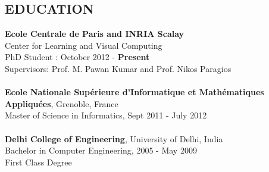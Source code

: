 \documentclass{res}
\begin{document}
        \begin{resume}


        \section{EDUCATION} 
{\bf Ecole Centrale de Paris and INRIA Scalay}\\ Center for Learning and Visual Computing\\ PhD Student : October 2012 - {\bf Present}\\ Supervisors: Prof. M. Pawan Kumar and Prof. Nikos Paragios \\  \\
{\bf Ecole Nationale Supérieure d'Informatique et Mathématiques Appliquées}, Grenoble, France  \\        
Master of Science in Informatics, Sept 2011 - July 2012   \\  \\
{\bf Delhi College of Engineering}, University of Delhi, India       \\   
Bachelor in Computer Engineering, 2005 - May 2009  \\        
First Class Degree          

\vspace{-5pt}

\end{resume}
\end{document}
